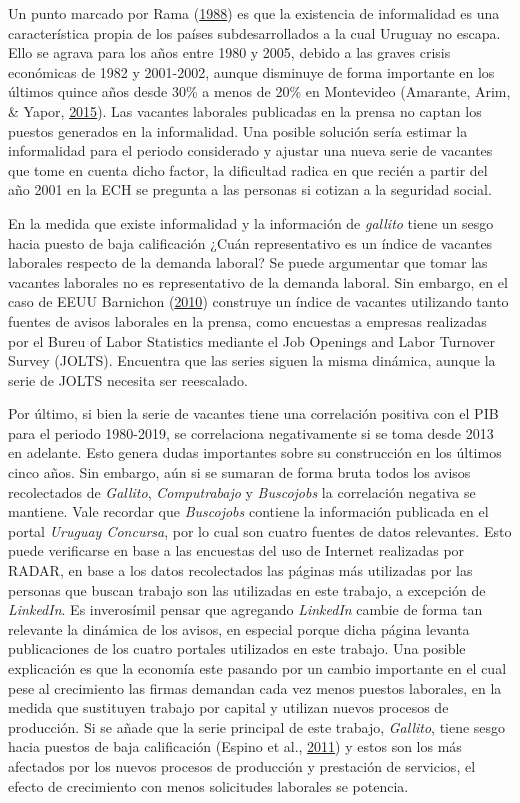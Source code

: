 \documentclass[12pt,oneside]{reedthesis}
\begin{document}
Un punto marcado por Rama (\protect\hyperlink{ref-Rama1988}{1988}) es que la existencia de informalidad es una característica propia de los países subdesarrollados a la cual Uruguay no escapa. Ello se agrava para los años entre 1980 y 2005, debido a las graves crisis económicas de 1982 y 2001-2002, aunque disminuye de forma importante en los últimos quince años desde 30\% a menos de 20\% en Montevideo (Amarante, Arim, \& Yapor, \protect\hyperlink{ref-Amarante2015}{2015}). Las vacantes laborales publicadas en la prensa no captan los puestos generados en la informalidad. Una posible solución sería estimar la informalidad para el periodo considerado y ajustar una nueva serie de vacantes que tome en cuenta dicho factor, la dificultad radica en que recién a partir del año 2001 en la ECH se pregunta a las personas si cotizan a la seguridad social.

En la medida que existe informalidad y la información de \emph{gallito} tiene un sesgo hacia puesto de baja calificación ¿Cuán representativo es un índice de vacantes laborales respecto de la demanda laboral? Se puede argumentar que tomar las vacantes laborales no es representativo de la demanda laboral. Sin embargo, en el caso de EEUU Barnichon (\protect\hyperlink{ref-Barnichon2010}{2010}) construye un índice de vacantes utilizando tanto fuentes de avisos laborales en la prensa, como encuestas a empresas realizadas por el Bureu of Labor Statistics mediante el Job Openings and Labor Turnover Survey (JOLTS). Encuentra que las series siguen la misma dinámica, aunque la serie de JOLTS necesita ser reescalado.

Por último, si bien la serie de vacantes tiene una correlación positiva con el PIB para el periodo 1980-2019, se correlaciona negativamente si se toma desde 2013 en adelante. Esto genera dudas importantes sobre su construcción en los últimos cinco años. Sin embargo, aún si se sumaran de forma bruta todos los avisos recolectados de \emph{Gallito}, \emph{Computrabajo} y \emph{Buscojobs} la correlación negativa se mantiene. Vale recordar que \emph{Buscojobs} contiene la información publicada en el portal \emph{Uruguay Concursa}, por lo cual son cuatro fuentes de datos relevantes. Esto puede verificarse en base a las encuestas del uso de Internet realizadas por RADAR, en base a los datos recolectados las páginas más utilizadas por las personas que buscan trabajo son las utilizadas en este trabajo, a excepción de \emph{LinkedIn}. Es inverosímil pensar que agregando \emph{LinkedIn} cambie de forma tan relevante la dinámica de los avisos, en especial porque dicha página levanta publicaciones de los cuatro portales utilizados en este trabajo. Una posible explicación es que la economía este pasando por un cambio importante en el cual pese al crecimiento las firmas demandan cada vez menos puestos laborales, en la medida que sustituyen trabajo por capital y utilizan nuevos procesos de producción. Si se añade que la serie principal de este trabajo, \emph{Gallito}, tiene sesgo hacia puestos de baja calificación (Espino et al., \protect\hyperlink{ref-Alma2011}{2011}) y estos son los más afectados por los nuevos procesos de producción y prestación de servicios, el efecto de crecimiento con menos solicitudes laborales se potencia.
\end{document}

